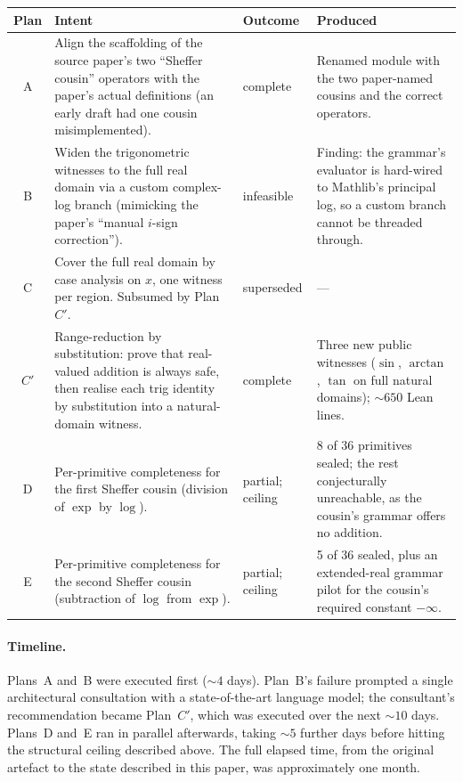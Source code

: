 \documentclass[11pt,a4paper]{article}
\theoremstyle{plain}
\theoremstyle{definition}
\begin{document}
\begin{center}
\scriptsize
\renewcommand{\arraystretch}{1.1}
\begin{tabularx}{\linewidth}{@{}c X l X@{}}
\toprule
\textbf{Plan} & \textbf{Intent} & \textbf{Outcome} & \textbf{Produced} \\
\midrule
A
  & Align the scaffolding of the source paper's two ``Sheffer cousin''
    operators with the paper's actual definitions (an early draft had
    one cousin misimplemented).
  & complete
  & Renamed module with the two paper-named cousins and the correct
    operators. \\
B
  & Widen the trigonometric witnesses to the full real domain via a
    custom complex-log branch (mimicking the paper's ``manual $i$-sign
    correction'').
  & infeasible
  & Finding: the grammar's evaluator is hard-wired to Mathlib's
    principal log, so a custom branch cannot be threaded through. \\
C
  & Cover the full real domain by case analysis on $x$, one witness
    per region. Subsumed by Plan~$C'$.
  & superseded
  & --- \\
$C'$
  & Range-reduction by substitution: prove that real-valued addition
    is always safe, then realise each trig identity by substitution
    into a natural-domain witness.
  & complete
  & Three new public witnesses ($\sin$, $\arctan$, $\tan$ on full
    natural domains); $\sim\!\!650$ Lean lines. \\
D
  & Per-primitive completeness for the first Sheffer cousin (division
    of $\exp$ by $\log$).
  & partial; ceiling
  & 8 of $36$ primitives sealed; the rest conjecturally unreachable,
    as the cousin's grammar offers no addition. \\
E
  & Per-primitive completeness for the second Sheffer cousin
    (subtraction of $\log$ from $\exp$).
  & partial; ceiling
  & 5 of $36$ sealed, plus an extended-real grammar pilot for the
    cousin's required constant $-\infty$. \\
\bottomrule
\end{tabularx}
\end{center}

\paragraph{Timeline.} Plans~A and~B were executed first ($\sim\!\!4$
days). Plan~B's failure prompted a single architectural consultation
with a state-of-the-art language model; the consultant's
recommendation became Plan~$C'$, which was executed over the next
$\sim\!\!10$ days. Plans~D and~E ran in parallel afterwards, taking
$\sim\!\!5$ further days before hitting the structural ceiling
described above. The full elapsed time, from the original artefact
to the state described in this paper, was approximately one month.
\end{document}
